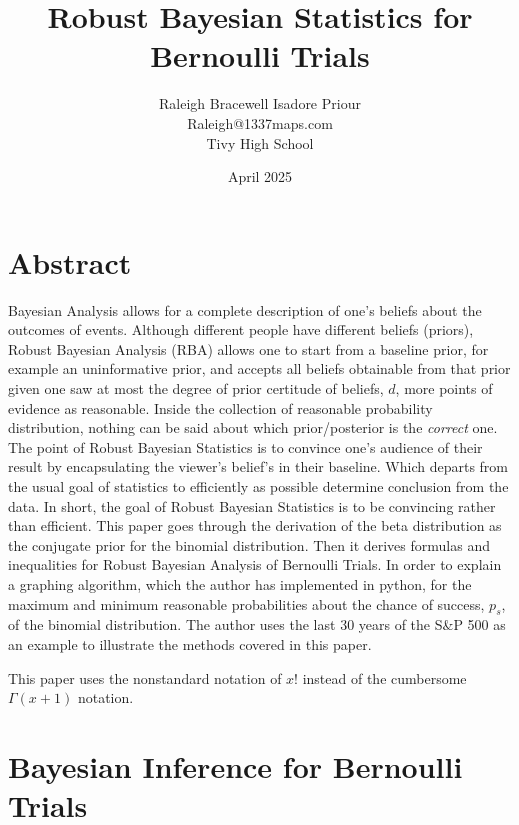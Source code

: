 \documentclass[12pt,letterpaper]{article}
\title{Robust Bayesian Statistics for Bernoulli Trials}
\author{Raleigh Bracewell Isadore Priour\\Raleigh@1337maps.com\\Tivy High School}
\date{April 2025}
\begin{document}
\pagestyle{fancy}
\fancyhf{}
\renewcommand{\headrulewidth}{0pt}
\fancyfoot[C]{\\\thepage}
\setlength{\mathindent}{0cm}
\setlength{\abovedisplayskip}{0pt}%
\setlength{\belowdisplayskip}{0pt}
\setlength{\abovedisplayshortskip}{0pt}%
\setlength{\belowdisplayshortskip}{0pt}
\allowdisplaybreaks
\maketitle
\section{Abstract}
Bayesian Analysis allows for a complete description of one's beliefs about the outcomes of events.
Although different people have different beliefs (priors), Robust Bayesian Analysis (RBA) allows one to start
from a baseline prior, for example an uninformative prior, and accepts all beliefs obtainable from that prior
given one saw at most the degree of prior certitude of beliefs, $d$, more points of evidence as reasonable. 
Inside the collection of reasonable probability distribution, nothing can be said about which prior/posterior is the \textit{correct} one. 
The point of Robust Bayesian Statistics is to convince one's audience of their result by encapsulating the viewer's belief's in their baseline.
Which departs from the usual goal of statistics to efficiently as possible determine conclusion from the data. 
In short, the goal of Robust Bayesian Statistics is to be convincing rather than efficient.
This paper goes through the derivation of the beta distribution as the conjugate prior for
the binomial distribution. Then it derives formulas and inequalities for Robust Bayesian Analysis of Bernoulli Trials.
In order to explain a graphing algorithm, which the author has implemented in python, 
for the maximum and minimum reasonable probabilities about the chance of success, $p_s$, of the binomial distribution. 
The author uses the last 30 years of the S\&P 500\cite{SP500} as an example to illustrate the methods covered in this paper.
\pagebreak
\tableofcontents
\par
This paper uses the nonstandard notation of $x!$ instead of the cumbersome $\Gamma(x+1)$ notation.
\section{Bayesian Inference for Bernoulli Trials}
\end{document}
